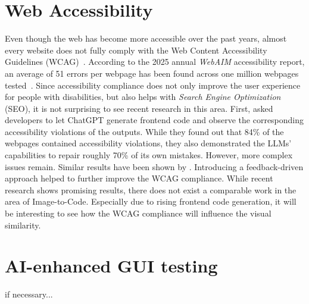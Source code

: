\section{Web Accessibility}
Even though the web has become more accessible over the past years, almost every website 
does not fully comply with the Web Content Accessibility Guidelines 
(WCAG)~\parencite{wcag22}. According to the 2025 annual \textit{WebAIM}
accessibility report, an average of 51 errors per webpage has been 
found across one million webpages tested~\parencite{webaim2025million}.
Since accessibility compliance does not only improve the user
experience for people with disabilities, but also helps with 
\textit{Search Engine Optimization} (SEO), it is not surprising to see 
recent research in this area. First, \textcite{aljedaani2024chatgpt}
asked developers to let ChatGPT generate frontend code and observe 
the corresponding accessibility violations of the outputs. While they 
found out that 84\% of the webpages contained accessibility violations,
they also demonstrated the LLMs' capabilities to repair roughly 
70\% of its own mistakes. However, more complex issues remain. 
Similar results have been shown by \textcite{suh2025accessiblecode}.
Introducing a feedback-driven approach helped to further improve 
the WCAG compliance.\newline
While recent research shows promising results, there does not exist 
a comparable work in the area of Image-to-Code. Especially due 
to rising frontend code generation, it will be interesting to see 
how the WCAG compliance will influence the visual similarity.


\section{AI-enhanced GUI testing}
if necessary...
